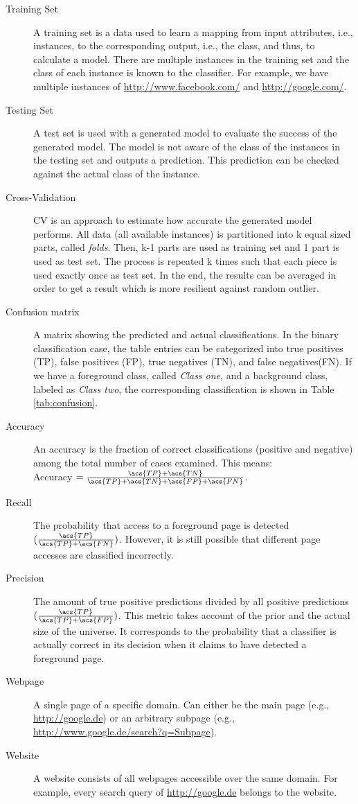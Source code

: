 \begin{description}
\item[Training Set] A training set is a data used to learn a mapping from input attributes, i.e., instances, to the corresponding output, i.e., the class, and thus, to calculate a model. %
There are multiple instances in the training set and the class of each instance is known to the classifier. For example, we have multiple instances of \url{http://www.facebook.com/} and \url{http://google.com/}.
\item[Testing Set] A test set is used with a generated model to evaluate the success of the generated model. The model is not aware of the class of the instances in the testing set and outputs a prediction. This prediction can be checked against the actual class of the instance.
\item[Cross-Validation] \ac{CV} is an approach to estimate how accurate the generated model performs. All data (all available instances) is partitioned into k equal sized parts, called \emph{folds}. Then, k-1 parts are used as training set and 1 part is used as test set. The process is repeated k times such that each piece is used exactly once as test set. In the end, the results can be averaged in order to get a result which is more resilient against random outlier.
\item[Confusion matrix] A matrix showing the predicted and actual classifications. In the binary classification case, the table entries can be categorized into true positives (\acs{TP}), false positives (\acs{FP}), true negatives (\acs{TN}), and false negatives(\acs{FN}). If we have a foreground class, called \emph{Class one}, and a background class, labeled as \emph{Class two}, the corresponding classification is shown in Table \ref{tab:confusion}.
\item[Accuracy] An accuracy is the fraction of correct classifications (positive and negative) among the total number of cases examined. This means:\\ 
Accuracy $= \frac{\acs{TP} + \acs{TN}}{\acs{TP} + \acs{TN} + \acs{FP} + \acs{FN}}$.
\item[Recall] The probability that access to a foreground page is detected $(\frac{\acs{TP}}{\acs{TP} + \acs{FN}})$. However, it is still possible that different page accesses are classified incorrectly.
\item[Precision] The amount of true positive predictions divided by all positive predictions $(\frac{\acs{TP}}{\acs{TP} + \acs{FP}})$. This metric takes account of the prior and the actual size of the universe. It corresponds to the probability that a classifier is actually correct in its decision when it claims to have detected a foreground page.
\item[Webpage] A single page of a specific domain. Can either be the main page (e.g., \url{http://google.de}) or an arbitrary subpage (e.g., \url{http://www.google.de/search?q=Subpage}).
\item[Website] A website consists of all webpages accessible over the same domain. For example, every search query of \url{http://google.de} belongs to the website.
\end{description}


